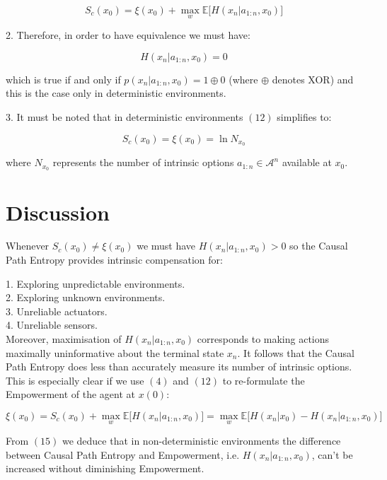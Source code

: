 \documentclass{article}
\begin{document}
\begin{equation}
S_c(x_0) = \xi(x_0)  + \max\limits_{w} \mathbb{E} \big[H(x_n|a_{1:n},x_0)\big]
\end{equation}

2. Therefore, in order to have equivalence we must have:

\begin{equation}
H(x_n|a_{1:n},x_0) = 0
\end{equation}

which is true if and only if $p(x_n|a_{1:n},x_0) = 1 \oplus 0$ (where $\oplus$ denotes XOR) and this is the case only in deterministic environments. 

3. It must be noted that in deterministic environments $(12)$ simplifies to:

\begin{equation}
S_c(x_0) = \xi(x_0)  = \ln N_{x_0}
\end{equation}

where $N_{x_0}$ represents the number of intrinsic options $a_{1:n} \in \mathcal{A}^n$ available at $x_0$. 

\section{Discussion}

Whenever $S_c(x_0) \neq \xi(x_0)$ we must have $H(x_n|a_{1:n},x_0) > 0$ so the Causal Path Entropy provides intrinsic compensation for:

1. Exploring unpredictable environments. \\
2. Exploring unknown environments. \\
3. Unreliable actuators. \\
4. Unreliable sensors. \\

Moreover, maximisation of $H(x_n|a_{1:n},x_0)$ corresponds to making actions maximally uninformative about the terminal state $x_n$. It follows that the Causal Path Entropy does less than accurately measure its number of intrinsic options. This is especially clear if we use $(4)$ and $(12)$ to re-formulate the Empowerment of the agent at $x(0)$:

\begin{equation}
\xi(x_0) = S_c(x_0)  + \max\limits_{w} \mathbb{E} \big[H(x_n|a_{1:n},x_0)\big] =  \max\limits_{w} \mathbb{E} \big[H(x_n|x_0) -H(x_n|a_{1:n},x_0)\big]
\end{equation}

From $(15)$ we deduce that in non-deterministic environments the difference between Causal Path Entropy and Empowerment, i.e. $H(x_n|a_{1:n},x_0)$, can't be increased without diminishing Empowerment. 
\end{document}
